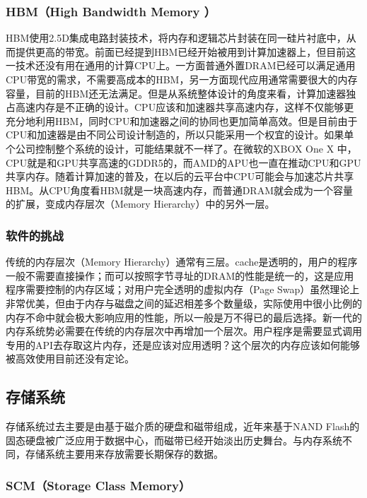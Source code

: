 \subsubsection{HBM（High Bandwidth Memory ）}

HBM使用2.5D集成电路封装技术，将内存和逻辑芯片封装在同一硅片衬底中，从而提供更高的带宽。前面已经提到HBM已经开始被用到计算加速器上，但目前这一技术还没有用在通用的计算CPU上。一方面普通外置DRAM已经可以满足通用CPU带宽的需求，不需要高成本的HBM，另一方面现代应用通常需要很大的内存容量，目前的HBM还无法满足。但是从系统整体设计的角度来看，计算加速器独占高速内存是不正确的设计。CPU应该和加速器共享高速内存，这样不仅能够更充分地利用HBM，同时CPU和加速器之间的协同也更加简单高效。但是目前由于CPU和加速器是由不同公司设计制造的，所以只能采用一个权宜的设计。如果单个公司控制整个系统的设计，可能结果就不一样了。在微软的XBOX One X 中，CPU就是和GPU共享高速的GDDR5的，而AMD的APU也一直在推动CPU和GPU共享内存。随着计算加速的普及，在以后的云平台中CPU可能会与加速芯片共享HBM。从CPU角度看HBM就是一块高速内存，而普通DRAM就会成为一个容量的扩展，变成内存层次（Memory Hierarchy）中的另外一层。

\subsubsection{软件的挑战}

传统的内存层次（Memory Hierarchy）通常有三层。cache是透明的，用户的程序一般不需要直接操作；而可以按照字节寻址的DRAM的性能是统一的，这是应用程序需要控制的内存区域；对用户完全透明的虚拟内存（Page Swap）虽然理论上非常优美，但由于内存与磁盘之间的延迟相差多个数量级，实际使用中很小比例的内存不命中就会极大影响应用的性能，所以一般是万不得已的最后选择。新一代的内存系统势必需要在传统的内存层次中再增加一个层次。用户程序是需要显式调用专用的API去存取这片内存，还是应该对应用透明？这个层次的内存应该如何能够被高效使用目前还没有定论。

\subsection{存储系统}

存储系统过去主要是由基于磁介质的硬盘和磁带组成，近年来基于NAND  Flash的固态硬盘被广泛应用于数据中心，而磁带已经开始淡出历史舞台。与内存系统不同，存储系统主要用来存放需要长期保存的数据。

\subsubsection{SCM（Storage Class Memory）}

